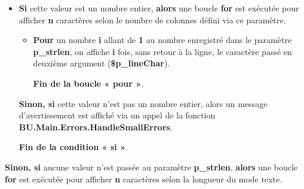 \documentclass[a4paper,10pt]{article}
\begin{document}
\begin{itemize}
    \item
    {
        \begin{justify}
            \textbf{\color{cond}Si} cette valeur est un nombre entier, \textbf{\color{cond}alors} une boucle \textbf{\color{loop}for} est exécutée pour afficher \textbf{n} caractères selon le nombre de colonnes défini via ce paramètre.\setlength{\parskip}{2em}
        \end{justify}

        \setlength{\parskip}{1em}

        \begin{itemize}
            \item
            {
                \begin{justify}
                    \textbf{\color{loop}Pour} un nombre \textbf{\color{vars}i} allant de \textbf{\color{loop}1} au nombre enregistré dans le paramètre \textbf{\color{vars}p\_strlen}, on affiche \textbf{\color{vars}i} fois, sans retour à la ligne, le caractère passé en deuxième argument (\textbf{\color{vars}\$p\_lineChar}).
                \end{justify}\setlength{\parskip}{1em}

                \begin{justify}
                    \textbf{\color{loop}Fin de la boucle « pour »}.
                \end{justify}
            }
        \end{itemize}

        \begin{justify}
            \textbf{\color{cond}Sinon, si} cette valeur n'est pas un nombre entier, alors un message d'avertissement est affiché via un appel de la fonction \textbf{\color{func}BU.Main.Errors.HandleSmallErrors}.
        \end{justify}

        \setlength{\parskip}{1em}

        \begin{justify}
            \textbf{\color{cond}Fin de la condition « si »}.
        \end{justify}

        \setlength{\parskip}{1em}
    }
\end{itemize}


\begin{justify}
    \textbf{\color{cond}Sinon, si} aucune valeur n'est passée au paramètre \textbf{\color{vars}p\_strlen}, \textbf{\color{cond}alors} une boucle \textbf{\color{loop}for} est exécutée pour afficher \textbf{n} caractères selon la longueur du mode texte.
\end{justify}\setlength{\parskip}{1em}
\end{document}
